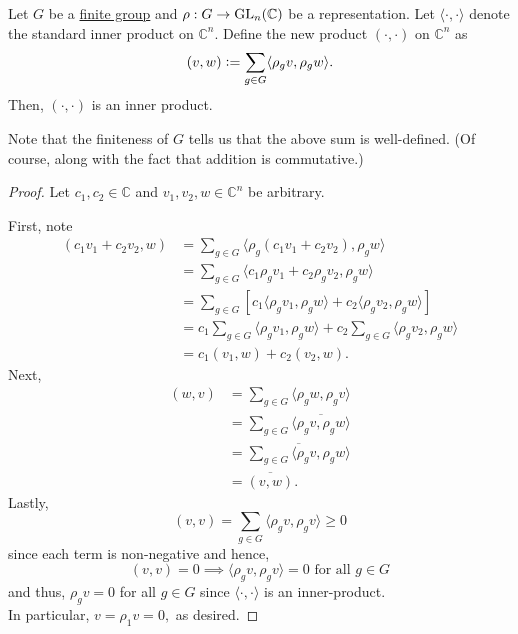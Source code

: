 \begin{lem} \label{lem:newinnerproduct}
	Let $G$ be a \underline{finite group} and $\rho:G \to \operatorname{GL}_n(\mathbb{C})$ be a representation. Let $\langle \cdot, \cdot\rangle$ denote the standard inner product on $\mathbb{C}^n.$ Define the new product $(\cdot, \cdot)$ on $\mathbb{C}^n$ as
	\begin{equation*} 
		(v, w) \vcentcolon= \sum_{g \in G} \langle \rho_gv, \rho_gw\rangle.
	\end{equation*}
	Then, $(\cdot, \cdot)$ is an inner product.
\end{lem}
Note that the finiteness of $G$ tells us that the above sum is well-defined. (Of course, along with the fact that addition is commutative.)
\begin{proof} 
	Let $c_1, c_2 \in \mathbb{C}$ and $v_1, v_2, w \in \mathbb{C}^n$ be arbitrary.

	First, note
	\begin{align*} 
		(c_1v_1 + c_2v_2, w) &= \sum_{g \in G} \langle \rho_g(c_1v_1 + c_2v_2), \rho_gw\rangle\\
		&= \sum_{g \in G} \langle c_1\rho_gv_1 + c_2\rho_gv_2, \rho_gw\rangle\\
		&= \sum_{g \in G} \left[c_1\langle \rho_gv_1, \rho_gw\rangle + c_2\langle \rho_gv_2, \rho_gw\rangle\right]\\
		&= c_1\sum_{g \in G} \langle \rho_gv_1, \rho_gw\rangle + c_2\sum_{g \in G} \langle \rho_gv_2, \rho_gw\rangle\\
		&= c_1(v_1, w) + c_2(v_2, w).
	\end{align*}
	Next, 
	\begin{align*} 
		(w, v) &= \sum_{g \in G} \langle \rho_gw, \rho_gv\rangle\\
		&= \sum_{g \in G} \overline{\langle \rho_gv, \rho_gw\rangle}\\
		&= \overline{\sum_{g \in G} \langle \rho_gv, \rho_gw\rangle}\\
		&= \overline{(v, w)}.
	\end{align*}
	Lastly,
	\begin{equation*} 
		(v, v) = \sum_{g \in G} \langle \rho_gv, \rho_gv\rangle \ge 0
	\end{equation*}
	since each term is non-negative and hence,
	\begin{equation*} 
		(v, v) = 0 \implies \langle \rho_gv, \rho_gv\rangle = 0 \text{ for all } g \in G
	\end{equation*}
	and thus, $\rho_gv = 0$ for all $g \in G$ since $\langle \cdot, \cdot\rangle$ is an inner-product.\\
	In particular, $v = \rho_1v = 0,$ as desired.
\end{proof}

